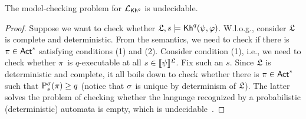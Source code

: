 \begin{theorem}\label{th:mc-khp-undecidable}
The model-checking problem for $\mathcal{L}_{{\mathsf{Kh}}^q}$ is undecidable.
\end{theorem}

\begin{proof}
    Suppose we want to check whether $\mathfrak{L},s\models{\mathsf{Kh}}^q(\psi,\varphi)$.  W.l.o.g., consider $\mathfrak{L}$ is complete and deterministic. 
    From the semantics, we need to check if there is $\pi\in{\rm \sf Act}^*$ satisfying conditions (1) and (2). Consider condition (1), i.e., we need to check whether $\pi$ is $q$-executable at all $s\in\llbracket \psi \rrbracket^{\mathfrak{L}}$. Fix such an $s$. Since $\mathfrak{L}$ is deterministic and complete, it all boils down to check whether there is $\pi\in{\rm \sf Act}^*$ such that $\mathrm{P}^\sigma_s(\pi)\geq q$ (notice that $\sigma$ is unique by determinism of $\mathfrak{L}$). 
    The latter solves the problem of checking whether the language recognized by a probabilistic (deterministic) automata is empty, which is undecidable~\cite{MadaniHC99}. 
\end{proof}